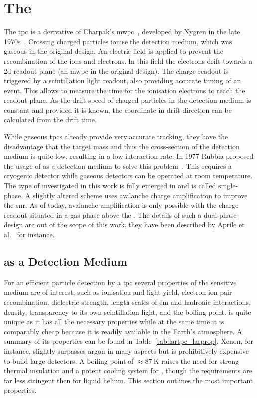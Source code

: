 \chapter{The }
\label{chap:lartpc}

The \gls{tpc} is a derivative of Charpak's \gls{mwpc}~\cite{mwpc}, developed by Nygren in the late 1970s~\cite{nygrenTPC}.
Crossing charged particles ionise the detection medium, which was gaseous in the original design.
An electric field is applied to prevent the recombination of the ions and electrons.
In this field the electrons drift towards a \gls{2d} readout plane (an \gls{mwpc} in the original design).
The charge readout is triggered by a scintillation light readout, also providing accurate timing of an event.
This allows to measure the time for the ionisation electrons to reach the readout plane.
As the drift speed of charged particles in the detection medium is constant and provided it is known, the coordinate in drift direction can be calculated from the drift time.

While gaseous \glspl{tpc} already provide very accurate tracking, they have the disadvantage that the target mass and thus the cross-section of the detection medium is quite low, resulting in a low interaction rate.
In 1977 Rubbia proposed the usage of \lar{} as a detection medium to solve this problem~\cite{lartpc}.
This requires a cryogenic detector while gaseous detectors can be operated at room temperature.
The type of \lartpc{} investigated in this work is fully emerged in \lar{} and is called single-phase.
A slightly altered scheme uses avalanche charge amplification to improve the \gls{snr}.
As of today, avalanche amplification is only possible with the charge readout situated in a gas phase above the \lar{}.
The details of such a dual-phase design are out of the scope of this work, they have been described by Aprile et al.~\cite{NobleGasDetectors} for instance.


\section{ as a Detection Medium}
\label{sec:lartpc_lar}

For an efficient particle detection by a \gls{tpc} several properties of the sensitive medium are of interest, such as ionisation and light yield, electron-ion pair recombination, dielectric strength, length scales of \gls{em} and hadronic interactions, density, transparency to its own scintillation light, and the boiling point.
\lar{} is quite unique as it has all the necessary properties while at the same time it is comparably cheap because it is readily available in the Earth's atmosphere.
A summary of its properties can be found in Table~\ref{tab:lartpc_larprop}.
Xenon, for instance, slightly surpasses argon in many aspects but is prohibitively expensive to build large detectors.
A boiling point of $\approx \SI{87}{\kelvin}$ raises the need for strong thermal insulation and a potent cooling system for \lar{}, though the requirements are far less stringent then for liquid helium.
This section outlines the most important \lar{} properties.

